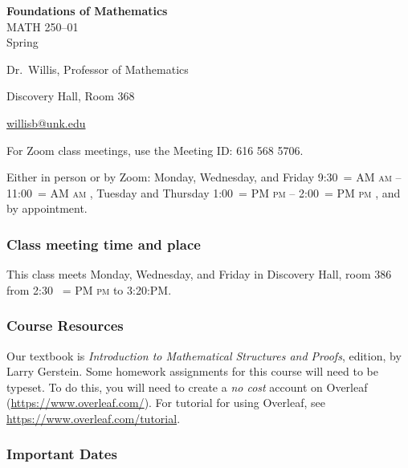 \documentclass[12pt]{article}
\makeatletter
\newcounter{ex}\setcounter{ex}{0}
\renewenvironment{description}[0]{\begin{compactdesc}}{\end{compactdesc}}
\DeclareRobustCommand{\maybefakesc}[1]{%
  \ifnum\pdfstrcmp{\f@series}{\bfdefault}=\z@
    {\fontsize{\dimexpr0.8\dimexpr\f@size pt\relax}{0}\selectfont\uppercase{#1}}%
  \else
    \textsc{#1}%
  \fi
}
\newcommand\AM{\,\maybefakesc{am}\xspace}
\newcommand\PM{\,\maybefakesc{pm}\xspace}
\newcommand{\coursename}{Foundations of Mathematics}
\newcommand{\coursenumber}{MATH 250}
\newcommand{\sectionnumber}{01}
\newcommand{\term}{Spring }
\newcommand{\room}{Discovery Hall, room 386}
\newcommand{\meetingtime}{This class meets Monday, Wednesday, and Friday in \room \/  from 2:30 \PM to 3:20:PM.}
\newcommand{\officehours}{Either in person or by Zoom: Monday, Wednesday, and Friday 9:30\AM -- 11:00\AM,
    Tuesday and Thursday 1:00\PM -- 2:00\PM, and by appointment.}
\makeatother
\begin{document}
\cleanlookdateon%
\shortdate
\printyearoff
\large
\begin{center}
    \textbf{\coursename}  \\
    {\coursenumber--\sectionnumber} \\
     {\term \the\year} \\
\end{center}

\vskip0.25in
\normalsize


\begin{center}
\begin{description}
    \item[Instructor:] Dr.\  Willis, Professor of Mathematics
    \item[Office:]  Discovery Hall, Room 368
    \item[\phone:]   
    \item[\Email:]    \href{mailto:willisb@unk.edu}{willisb@unk.edu}
    \item[Zoom for classes:] For Zoom class meetings, use the Meeting ID: 616 568 5706. 
    \item[Office Hours:] \officehours
  \end{description}
\end{center}

\subsubsection*{Class meeting time and place}

\meetingtime



\subsubsection*{Course Resources}

\noindent Our textbook is \emph{Introduction to Mathematical Structures and Proofs},  edition,  by  Larry Gerstein.
Some homework assignments for this course will need to be typeset. To do this, you will need to create a \emph{no cost} 
account on Overleaf (\url{https://www.overleaf.com/}).   For  tutorial for using Overleaf, see \url{https://www.overleaf.com/tutorial}.



\subsubsection*{Important Dates}
\end{document}
